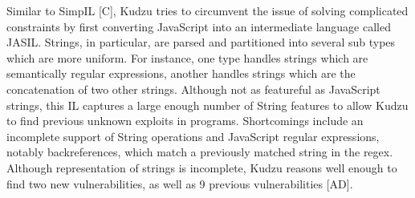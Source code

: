 \documentclass[11pt,expanded,copyright]{fsuthesis}
\begin{document}
Similar to SimpIL [C], Kudzu tries to circumvent the issue of solving complicated constraints by first converting JavaScript into an intermediate language called JASIL. Strings, in particular, are parsed and partitioned into several sub types which are more uniform. For instance, one type handles strings which are semantically regular expressions, another handles strings which are the concatenation of two other strings. Although not as featureful as JavaScript strings, this IL captures a large enough number of String features to allow Kudzu to find previous unknown exploits in programs. Shortcomings include an incomplete support of String operations and JavaScript regular expressions, notably backreferences, which match a previously matched string in the regex. Although representation of strings is incomplete, Kudzu reasons well enough to find two new vulnerabilities, as well as 9 previous vulnerabilities [AD].








\end{document}
